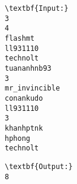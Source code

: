 \begin{verbatim}
\textbf{Input:}
3
4
flashmt
ll931110
technolt
tuananhnb93
3
mr_invincible
conankudo
ll931110
3
khanhptnk
hphong
technolt\end{verbatim}
\begin{verbatim}
\textbf{Output:}
8\end{verbatim}